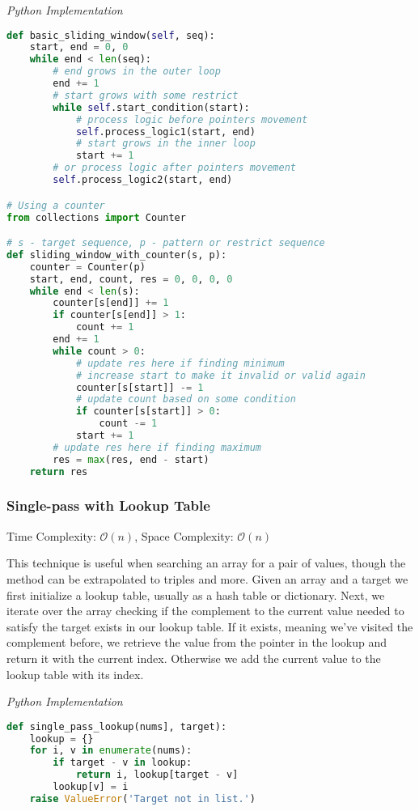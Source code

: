 \documentclass{article}
\newcommand{\bigO}{\ensuremath{\mathcal{O}}}
\begin{document}
\vspace{8pt} \emph{Python Implementation}
\begin{lstlisting}[language=Python]
def basic_sliding_window(self, seq):
    start, end = 0, 0
    while end < len(seq):
        # end grows in the outer loop
        end += 1
        # start grows with some restrict
        while self.start_condition(start):
            # process logic before pointers movement
            self.process_logic1(start, end)
            # start grows in the inner loop
            start += 1
        # or process logic after pointers movement
        self.process_logic2(start, end)

# Using a counter
from collections import Counter

# s - target sequence, p - pattern or restrict sequence
def sliding_window_with_counter(s, p):
    counter = Counter(p)
    start, end, count, res = 0, 0, 0, 0
    while end < len(s):
        counter[s[end]] += 1
        if counter[s[end]] > 1:
            count += 1
        end += 1
        while count > 0:
            # update res here if finding minimum
            # increase start to make it invalid or valid again
            counter[s[start]] -= 1
            # update count based on some condition
            if counter[s[start]] > 0:
                count -= 1
            start += 1
        # update res here if finding maximum
        res = max(res, end - start)
    return res
\end{lstlisting}

    \subsubsection{Single-pass with Lookup Table}
    Time Complexity: $\bigO(n)$, Space Complexity: $\bigO(n)$
    
    This technique is useful when searching an array for a pair of values, though the method can be extrapolated to triples and more. Given an array and a target we first initialize a lookup table, usually as a hash table or dictionary. Next, we iterate over the array checking if the complement to the current value needed to satisfy the target exists in our lookup table. If it exists, meaning we've visited the complement before, we retrieve the value from the pointer in the lookup and return it with the current index. Otherwise we add the current value to the lookup table with its index.


\vspace{8pt} \emph{Python Implementation}
\begin{lstlisting}[language=Python]
def single_pass_lookup(nums], target):
    lookup = {}
    for i, v in enumerate(nums):
        if target - v in lookup:
            return i, lookup[target - v]
        lookup[v] = i
    raise ValueError('Target not in list.')
\end{lstlisting}
    
\end{document}

